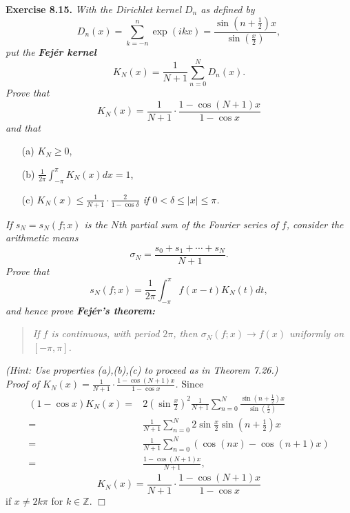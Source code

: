 \documentclass{article}
\begin{document}



\textbf{Exercise 8.15.}
\emph{With the Dirichlet kernel $D_n$ as defined by
\[
  D_n(x)
  = \sum_{k=-n}^{n} \exp(ikx)
  = \frac{\sin(n+\frac{1}{2})x}{\sin(\frac{x}{2})},
\]
put the \textbf{Fej\'er kernel}
\[
  K_N(x) = \frac{1}{N+1} \sum_{n=0}^{N} D_n(x).
\]
Prove that
\[
  K_N(x) = \frac{1}{N+1} \cdot \frac{1-\cos(N+1)x}{1-\cos x}
\]
and that}
\begin{enumerate}
  \item[(a)]
  $K_N \geq 0$,

  \item[(b)]
  $\frac{1}{2\pi} \int_{-\pi}^{\pi} K_N(x) dx = 1$,

  \item[(c)]
  \emph{$K_N(x) \leq \frac{1}{N+1} \cdot \frac{2}{1-\cos \delta}$
  if $0 < \delta \leq |x| \leq \pi$.}
\end{enumerate}

\emph{If $s_N = s_N(f;x)$ is the $N$th partial sum of the Fourier series of $f$,
consider the arithmetic means
\[
  \sigma_N = \frac{s_0+s_1+\cdots+s_N}{N+1}.
\]
Prove that
\[
  s_N(f;x) = \frac{1}{2\pi} \int_{-\pi}^{\pi} f(x-t)K_N(t)dt,
\]
and hence prove \textbf{Fej\'er's theorem:}}
\begin{quote}
  \emph{If $f$ is continuous, with period $2\pi$,
  then $\sigma_N(f;x) \to f(x)$ uniformly on $[-\pi,\pi]$.}
\end{quote}
\emph{(Hint: Use properties (a),(b),(c) to proceed as in Theorem 7.26.)} \\



\emph{Proof of $K_N(x) = \frac{1}{N+1} \cdot \frac{1-\cos(N+1)x}{1-\cos x}$.}
Since
  \begin{align*}
    (1-\cos x) K_N(x)
    =& 2 \left( \sin \frac{x}{2} \right)^2 \frac{1}{N+1}
      \sum_{n=0}^{N} \frac{\sin(n+\frac{1}{2})x}{\sin(\frac{x}{2})} \\
    =& \frac{1}{N+1}
      \sum_{n=0}^{N} 2 \sin \frac{x}{2} \sin(n+\frac{1}{2})x \\
    =& \frac{1}{N+1}
      \sum_{n=0}^{N} (\cos(nx) - \cos(n+1)x) \\
    =& \frac{1 - \cos(N+1)x}{N+1},
  \end{align*}
\[
  K_N(x) = \frac{1}{N+1} \cdot \frac{1-\cos(N+1)x}{1-\cos x}
\]
if $x \neq 2k\pi$ for $k \in \mathbb{Z}$.
$\Box$ \\
\end{document}
